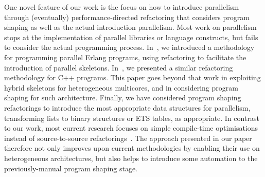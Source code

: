 \documentclass[final]{jfp1}
\begin{document}
One novel feature of our work is the focus on how to introduce parallelism
through (eventually) performance-directed refactoring that considers program
shaping as well as the actual introduction parallelism.
Most work on parallelism stops at the implementation of parallel libraries or
language constructs,
but fails to consider the actual programming process.
In~\cite{hlpp}, we introduced a methodology for programming parallel
Erlang programs, using refactoring to facilitate the introduction of
parallel skeletons. In~\cite{pdp}, we presented a similar refactoring
methodology for C++ programs. This paper goes beyond that work in
exploiting hybrid skeletons for heterogeneous multicores, and in
considering program shaping for such architecture. Finally, we have
considered program shaping refactorings to introduce the most appropriate
data structures for parallelism, transforming lists to binary structures
or ETS tables, as appropriate.  In contrast to our work, most current
research focuses on simple compile-time optimisations instead of
source-to-source refactorings~\cite{Groot:2007:ATL}.  The approach
presented in our paper therefore not only improves upon current
methodologies by enabling their use on heterogeneous architectures, but
also helps to introduce some automation to the previously-manual program
shaping stage.



\end{document}
